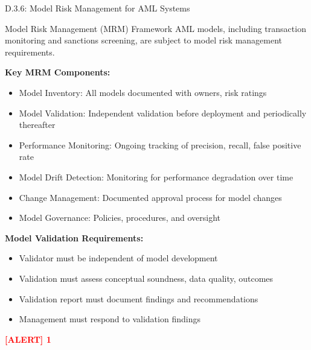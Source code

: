 \documentclass[11pt,a4paper]{beamer}
\newcommand{\redflag}[1]{\textcolor{red}{\textbf{[ALERT] 1}}}
\begin{document}
\begin{frame}{D.3.6: Model Risk Management for AML Systems}
	\begin{block}{Model Risk Management (MRM) Framework}
		AML models, including transaction monitoring and sanctions screening, are subject to model risk management requirements.
	\end{block}
	\textbf{Key MRM Components:}
	\begin{itemize}
		\item Model Inventory: All models documented with owners, risk ratings
		\item Model Validation: Independent validation before deployment and periodically thereafter
		\item Performance Monitoring: Ongoing tracking of precision, recall, false positive rate
		\item Model Drift Detection: Monitoring for performance degradation over time
		\item Change Management: Documented approval process for model changes
		\item Model Governance: Policies, procedures, and oversight
	\end{itemize}
	\textbf{Model Validation Requirements:}
	\begin{itemize}
		\item Validator must be independent of model development
		\item Validation must assess conceptual soundness, data quality, outcomes
		\item Validation report must document findings and recommendations
		\item Management must respond to validation findings
	\end{itemize}
	\redflag{A model that cannot be explained (black box AI) creates significant regulatory risk.}
\end{frame}
\end{document}
